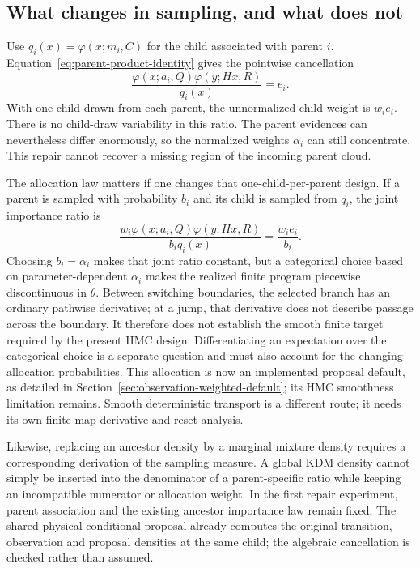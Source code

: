 \subsection{What changes in sampling, and what does not}

Use $q_i(x)=\varphi(x;m_i,C)$ for the child associated with parent $i$.
Equation~\eqref{eq:parent-product-identity} gives the pointwise cancellation
\begin{equation}
 \frac{\varphi(x;a_i,Q)\varphi(y;Hx,R)}{q_i(x)}=e_i.
 \label{eq:parent-cancellation}
\end{equation}
With one child drawn from each parent, the unnormalized child weight is
$w_i e_i$. There is no child-draw variability in this ratio. The parent
evidences can nevertheless differ enormously, so the normalized weights
$\alpha_i$ can still concentrate. This repair cannot recover a missing region
of the incoming parent cloud.

The allocation law matters if one changes that one-child-per-parent design.
If a parent is sampled with probability $b_i$ and its child is sampled from
$q_i$, the joint importance ratio is
\begin{equation}
 \frac{w_i\varphi(x;a_i,Q)\varphi(y;Hx,R)}{b_iq_i(x)}
       =\frac{w_ie_i}{b_i}.
 \label{eq:parent-allocation-ratio}
\end{equation}
Choosing $b_i=\alpha_i$ makes that joint ratio constant, but a categorical
choice based on parameter-dependent $\alpha_i$ makes the realized finite
program piecewise discontinuous in $\theta$. Between switching boundaries,
the selected branch has an ordinary pathwise derivative; at a jump, that
derivative does not describe passage across the boundary. It therefore does
not establish the smooth finite target required by the present HMC design.
Differentiating an expectation over the categorical choice is a separate
question and must also account for the changing allocation probabilities. This
allocation is now an implemented proposal default, as detailed in
Section~\ref{sec:observation-weighted-default}; its HMC smoothness limitation
remains. Smooth deterministic transport is a different route;
it needs its own finite-map derivative and reset analysis.

Likewise, replacing an ancestor density by a marginal mixture density requires
a corresponding derivation of the sampling measure. A global KDM density
cannot simply be inserted into the denominator of a parent-specific ratio
while keeping an incompatible numerator or allocation weight. In the first
repair experiment, parent association and the existing ancestor importance
law remain fixed. The shared physical-conditional proposal already computes
the original transition, observation and proposal densities at the same
child; the algebraic cancellation is checked rather than assumed.

